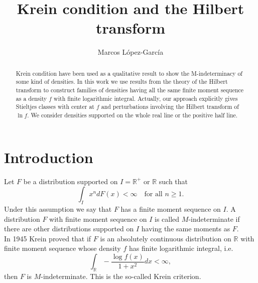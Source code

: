 \documentclass{amsart}
\newcommand{\R}{\mathbb{R}}
\begin{document}
\title{Krein condition and the Hilbert transform}
\author{Marcos L\'{o}pez-Garc\'{i}a}

\address{
Instituto de Matem\'{a}ticas-Unidad Cuernavaca \\
   Universidad Nacional Aut\'{o}noma de M\'{e}xico\\
   Apdo. Postal 273-3, Cuernavaca Mor. CP 62251, M\'exico}

\maketitle

\begin{abstract}
Krein condition have been used as a qualitative result to show the M-indeterminacy of some kind of densities. In this work we use results from the theory of the Hilbert transform to construct families of densities having all the same finite moment sequence as a density $f$ with finite logarithmic integral. Actually, our approach explicitly gives Stieltjes classes with center at $f$ and perturbations involving the Hilbert transform of $\ln f.$ We consider densities supported on the whole real line or the positive half line.
\end{abstract}

\section{Introduction}
Let $F$ be a distribution supported on $I=\mathbb{R}^{+}$ or $\mathbb{R}$ such that 
$$\int_I x^n dF(x) < \infty \quad \text{for all } n\geq 1.$$
Under this assumption we say that $F$ has a finite moment sequence on $I$. A distribution $F$ with finite moment sequence on $I$ is called $M$-indeterminate if there are other distributions supported on $I$ having the same moments as $F$. \\

In 1945 Krein proved that if $F$ is an absolutely continuous distribution on $\R$ with finite moment sequence whose density $f$ has finite logarithmic integral, i.e. 
\begin{equation}\label{logint}
\int_{\mathbb{R}}-\frac{\log f\left( x\right) }{1+x^{2}}dx<\infty ,
\end{equation}
then $F$ is $M$-indeterminate. This is the so-called Krein criterion.\\
\end{document}
